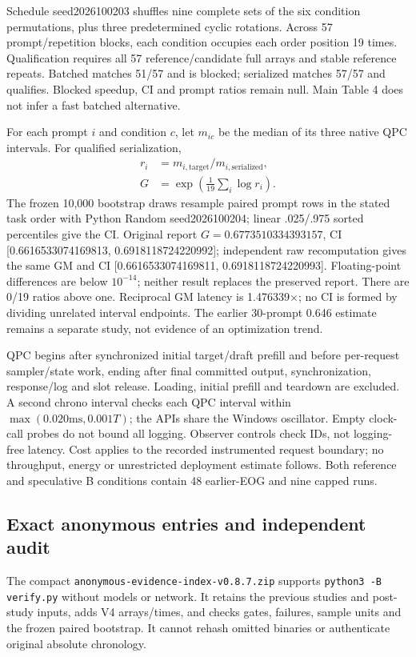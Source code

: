 Schedule seed2026100203 shuffles nine complete sets of the six condition permutations, plus three predetermined cyclic rotations. Across 57 prompt/repetition blocks, each condition occupies each order position 19 times. Qualification requires all 57 reference/candidate full arrays and stable reference repeats. Batched matches 51/57 and is blocked; serialized matches 57/57 and qualifies. Blocked speedup, CI and prompt ratios remain null. Main Table 4 does not infer a fast batched alternative.

For each prompt $i$ and condition $c$, let $m_{ic}$ be the median of its three native QPC intervals. For qualified serialization,
\[
\begin{aligned}
r_i&=m_{i,\mathrm{target}}/m_{i,\mathrm{serialized}},\\
G&=\exp\!\left(\frac1{19}\sum_i\log r_i\right).\end{aligned}
\]
The frozen 10,000 bootstrap draws resample paired prompt rows in the stated task order with Python Random seed2026100204; linear .025/.975 sorted percentiles give the CI. Original report $G=0.6773510334393157$, CI [0.6616533074169813, 0.6918118724220992]; independent raw recomputation gives the same GM and CI [0.6616533074169811, 0.6918118724220993]. Floating-point differences are below $10^{-14}$; neither result replaces the preserved report. There are 0/19 ratios above one. Reciprocal GM latency is 1.476339$\times$; no CI is formed by dividing unrelated interval endpoints. The earlier 30-prompt 0.646 estimate remains a separate study, not evidence of an optimization trend.

QPC begins after synchronized initial target/draft prefill and before per-request sampler/state work, ending after final committed output, synchronization, response/log and slot release. Loading, initial prefill and teardown are excluded. A second chrono interval checks each QPC interval within $\max(0.020\mathrm{ms},0.001T)$; the APIs share the Windows oscillator. Empty clock-call probes do not bound all logging. Observer controls check IDs, not logging-free latency. Cost applies to the recorded instrumented request boundary; no throughput, energy or unrestricted deployment estimate follows. Both reference and speculative B conditions contain 48 earlier-EOG and nine capped runs.

\subsection{Exact anonymous entries and independent audit}
The compact \nolinkurl{anonymous-evidence-index-v0.8.7.zip} supports \texttt{python3 -B verify.py} without models or network. It retains the previous studies and post-study inputs, adds V4 arrays/times, and checks gates, failures, sample units and the frozen paired bootstrap. It cannot rehash omitted binaries or authenticate original absolute chronology.

